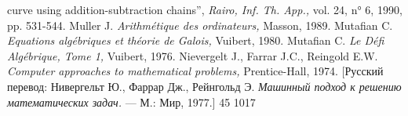 \documentclass{../../template/mai_book}
\begin{document}
curve using addition-subtraction chains”, {\itshape Rairo, Inf. Th. App.,} vol. 24, n° 6, 1990, pp. 531-544. \newline
[132] Muller J. {\itshape Arithm\'{e}tique des ordinateurs,} Masson, 1989. \newline
[133] Mutafian C. {\itshape Equations alg\'{e}briques et th\'{e}orie de Galois,} Vuibert, 1980. \newline
[134] Mutafian C. {\itshape Le D\'{e}fi Alg\'{e}brique, Tome 1,} Vuibert, 1976. \newline
[135] Nievergelt J., Farrar J.C., Reingold E.W. {\itshape Computer approaches to \newline mathematical problems,} Prentice-Hall, 1974. [Русский перевод: Нивергельт Ю., Фаррар Дж., Рейнгольд Э. {\itshape Машинный подход к решению математических задач.} — М.: Мир, 1977.] \newline
\newline 
\newline 
\newline 
\newline 
\newline
{\footnotesize 45 1017} 
\end{document}
